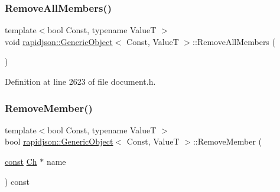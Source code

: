 \mbox{\label{classrapidjson_1_1_generic_object_adce47ea944260d77171c710f34d4e402}} 
\subsubsection{\texorpdfstring{RemoveAllMembers()}{RemoveAllMembers()}}
{\footnotesize\ttfamily template$<$bool Const, typename ValueT $>$ \\
void \mbox{\hyperlink{classrapidjson_1_1_generic_object}{rapidjson\+::\+Generic\+Object}}$<$ Const, ValueT $>$\+::Remove\+All\+Members (\begin{DoxyParamCaption}{ }\end{DoxyParamCaption})}



Definition at line 2623 of file document.\+h.


\begin{DoxyCode}{0}

\end{DoxyCode}
\mbox{\label{classrapidjson_1_1_generic_object_aa96ab7566d9d7cce166d8b51cd072b92}} 
\subsubsection{\texorpdfstring{RemoveMember()}{RemoveMember()}\hspace{0.1cm}{\footnotesize\ttfamily [1/3]}}
{\footnotesize\ttfamily template$<$bool Const, typename ValueT $>$ \\
bool \mbox{\hyperlink{classrapidjson_1_1_generic_object}{rapidjson\+::\+Generic\+Object}}$<$ Const, ValueT $>$\+::Remove\+Member (\begin{DoxyParamCaption}\item[{\mbox{\hyperlink{classrapidjson_1_1_generic_object_a3524fcb5f36c034aabd8afa19fc16d9e}{const}} \mbox{\hyperlink{classrapidjson_1_1_generic_object_a947f543afbdd5e6d1c5b2dd1fe5a6e60}{Ch}} $\ast$}]{name }\end{DoxyParamCaption}) const}



